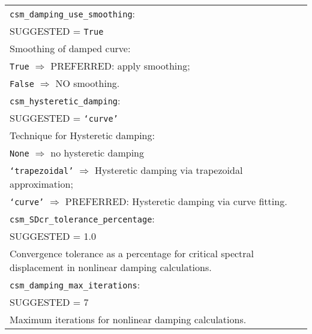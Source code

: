 \vspace{2em}
\begin{tabular}{|p{\textwidth}|}
\hline \vspace{0.1em} \texttt{csm\_damping\_use\_smoothing}: \\
SUGGESTED = \texttt{True} \\
Smoothing of damped curve: \\
 \hspace{0.5em} \texttt{True} $\Rightarrow$ \small{PREFERRED}: apply smoothing; \\
 \hspace{0.5em} \texttt{False} $\Rightarrow$ NO smoothing.\\
\hline \vspace{0.1em} \texttt{csm\_hysteretic\_damping}: \\
SUGGESTED = \texttt{`curve'} \\
Technique for Hysteretic  damping: \\
 \hspace{0.5em} \texttt{None} $\Rightarrow$ no hysteretic  damping \\
 \hspace{0.5em} \texttt{`trapezoidal'} $\Rightarrow$ Hysteretic  damping via trapezoidal approximation; \\
 \hspace{0.5em} \texttt{`curve'} $\Rightarrow$ \small{PREFERRED}: Hysteretic  damping via curve fitting. \\
\hline \vspace{0.1em} \texttt{csm\_SDcr\_tolerance\_percentage}: \\
SUGGESTED = 1.0 \\
Convergence tolerance as a percentage for critical spectral
displacement in nonlinear damping calculations. \\
\hline \vspace{0.1em} \texttt{csm\_damping\_max\_iterations}: \\
SUGGESTED = 7 \\
 Maximum iterations for nonlinear damping calculations.\\
 \hline
 \end{tabular}


